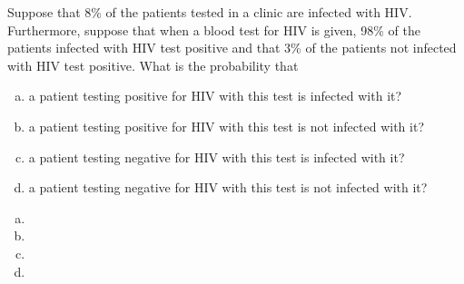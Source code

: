 \documentclass[../main.tex]{subfiles}
\begin{document}
Suppose that 8\% of the patients tested in a clinic are infected with HIV.
Furthermore, suppose that when a blood test for HIV is given, 98\% of the patients infected with HIV test positive and that 3\% of the patients not infected with HIV test positive.
What is the probability that
\begin{enumerate}[a)]
	\item a patient testing positive for HIV with this test is infected with it?
	\item a patient testing positive for HIV with this test is not infected with it?
	\item a patient testing negative for HIV with this test is infected with it?
	\item a patient testing negative for HIV with this test is not infected with it?
\end{enumerate}

\solution
\begin{enumerate}[a)]
	\item 
	\item 
	\item 
	\item 
\end{enumerate}
\end{document}
